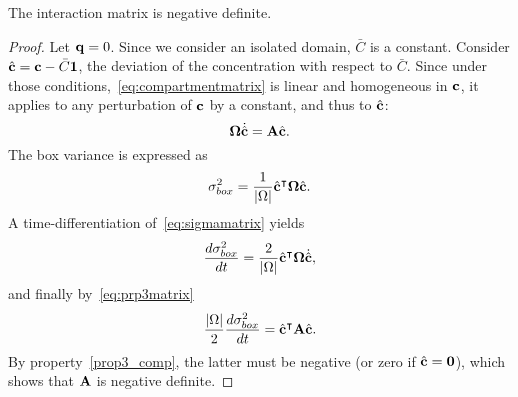 \begin{property} \label{prop3bis_comp}
	The interaction matrix is negative definite.
\end{property}
\begin{proof}
	Let $\mathbf q = 0$. Since we consider an isolated domain, $\bar C$ is a constant.
	Consider $\hat{\mathbf c} = \mathbf c - \bar C \mathbf 1$, the deviation of the concentration with respect to $\bar C$. Since under those conditions,~\eqref{eq:compartmentmatrix} is linear and homogeneous in $\mathbf c$, it applies to any perturbation of $\mathbf c$ by a constant, and thus to $\hat{\mathbf c}$:
	\begin{equation} \label{eq:prp3matrix}
		\boldsymbol \Omega \dot{\hat{\mathbf c}} = \mathbf A \hat{\mathbf c}.
	\end{equation}
	The box variance is expressed as
	\begin{equation}\label{eq:sigmamatrix}
		\sigma^2_{box} = \frac{1}{|\Omega|} \hat{\mathbf c}^\intercal \boldsymbol \Omega \hat{\mathbf c}.
	\end{equation}
	A time-differentiation of~\eqref{eq:sigmamatrix} yields
	\begin{equation}
		\frac{d \sigma^2_{box}}{dt} = \frac{2}{|\Omega|} \hat{\mathbf c}^\intercal \boldsymbol \Omega \dot{\hat{\mathbf c}},
	\end{equation}
	and finally by~\eqref{eq:prp3matrix}
	\begin{equation}
		\frac{|\Omega|}{2} \frac{d \sigma^2_{box}}{dt} = \hat{\mathbf c}^\intercal \mathbf A \hat{\mathbf c}.
	\end{equation}
	By property~\ref{prop3_comp}, the latter must be negative (or zero if $\hat{\mathbf c} = \mathbf 0$), which shows that $\mathbf A$ is negative definite.
\end{proof}